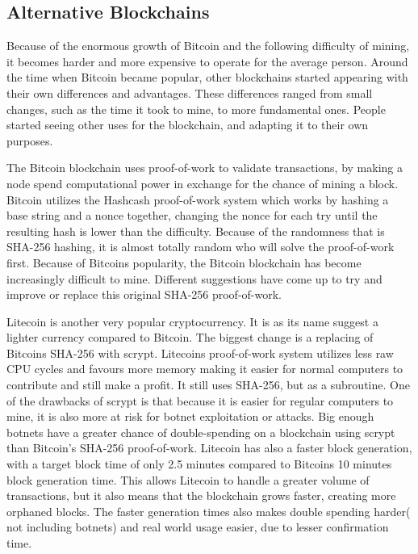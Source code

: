 \documentclass[12pt]{article}
\begin{document}
\subsection{Alternative Blockchains}\label{subsec:difblocks}
Because of the enormous growth of Bitcoin and the following difficulty of mining, it becomes harder and more expensive to operate for the average person. Around the time when Bitcoin became popular, other blockchains started appearing with their own differences and advantages. These differences ranged from small changes, such as the time it took to mine, to more fundamental ones. People started seeing other uses for the blockchain, and adapting it to their own purposes. 

The Bitcoin blockchain uses proof-of-work to validate transactions, by making a node spend computational power in exchange for the chance of mining a block. Bitcoin utilizes the Hashcash\cite{hashcash} proof-of-work system which works by hashing a base string and a nonce together, changing the nonce for each try until the resulting hash is lower than the difficulty. Because of the randomness that is SHA-256 hashing, it is almost totally random who will solve the proof-of-work first. Because of Bitcoins popularity, the Bitcoin blockchain has become increasingly difficult to mine. Different suggestions have come up to try and improve or replace this original SHA-256 proof-of-work. 

Litecoin is another very popular cryptocurrency. It is as its name suggest a lighter currency compared to Bitcoin. The biggest change is a replacing of Bitcoins SHA-256 with scrypt. Litecoins proof-of-work system utilizes less raw CPU cycles and favours more memory making it easier for normal computers to contribute and still make a profit. It still uses SHA-256, but as a subroutine. One of the drawbacks of scrypt is that because it is easier for regular computers to mine, it is also more at risk for botnet exploitation or attacks. Big enough botnets have a greater chance of double-spending on a blockchain using scrypt than Bitcoin's SHA-256 proof-of-work. Litecoin has also a faster block generation, with a target block time of only 2.5 minutes compared to Bitcoins 10 minutes block generation time. This allows Litecoin to handle a greater volume of transactions, but it also means that the blockchain grows faster, creating more orphaned blocks. The faster generation times also makes double spending harder( not including botnets) and real world usage easier, due to lesser confirmation time. 
\end{document}
